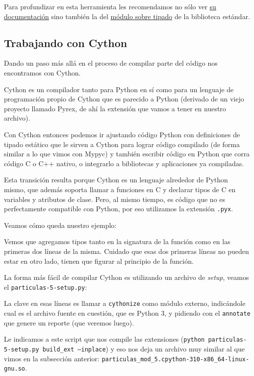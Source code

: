 Para profundizar en esta herramienta les recomendamos no sólo ver \href{https://mypy-lang.org/}{su documentación} sino también la del \href{https://docs.python.org/es/dev/library/typing.html}{módulo sobre tipado} de la biblioteca estándar.


\subsection{Trabajando con Cython}

Dando un paso más allá en el proceso de compilar parte del código nos encontramos con Cython.

Cython es un compilador tanto para Python en sí como para un lenguaje de programación propio de Cython que es parecido a Python (derivado de un viejo proyecto llamado Pyrex, de ahí la extensión que vamos a tener en nuestro archivo).

Con Cython entonces podemos ir ajustando código Python con definiciones de tipado estático que le sirven a Cython para lograr código compilado (de forma similar a lo que vimos con Mypyc) y también escribir código en Python que corra código C o C++ nativo, o integrarlo a bibliotecas y aplicaciones ya compiladas.

Esta transición resulta porque Cython es un lenguaje alrededor de Python mismo, que además soporta llamar a funciones en C y declarar tipos de C en variables y atributos de clase. Pero, al mismo tiempo, es código que no es perfectamente compatible con Python, por eso utilizamos la extensión \texttt{.pyx}. 

Veamos cómo queda nuestro ejemplo:


Vemos que agregamos tipos tanto en la signatura de la función como en las primeras dos líneas de la misma. Cuidado que esas dos primeras líneas no pueden estar en otro lado, tienen que figurar al principio de la función.

La forma más fácil de compilar Cython es utilizando un archivo de \textit{setup}, veamos el \texttt{particulas-5-setup.py}:


La clave en esas líneas es llamar a \texttt{cythonize} como módulo externo, indicándole cual es el archivo fuente en cuestión, que es Python 3, y pidiendo con el \texttt{annotate} que genere un reporte (que veremos luego).

Le indicamos a este script que nos compile las extensiones (\texttt{python particulas-5-setup.py build\_ext --inplace}) y eso nos deja un archivo muy similar al que vimos en la subsección anterior: \texttt{particulas\_mod\_5.cpython-310-x86\_64-linux-gnu.so}.

